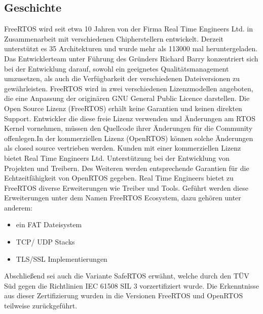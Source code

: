 \subsection{Geschichte}
FreeRTOS wird seit etwa 10 Jahren von der Firma Real Time Engineers Ltd. in Zusammenarbeit mit verschiedenen Chipherstellern entwickelt. Derzeit unterstützt es 35 Architekturen und wurde mehr als 113000 mal heruntergeladen. Das Entwicklerteam unter Führung des Gründers Richard Barry konzentriert sich bei der Entwicklung darauf, sowohl ein geeignetes Qualitätsmanagement umzusetzen, als auch die Verfügbarkeit der verschiedenen Dateiversionen zu gewährleisten. FreeRTOS wird in zwei verschiedenen Lizenzmodellen angeboten, die eine Anpassung der originären GNU General Public Licence darstellen. Die Open Source Lizenz (FreeRTOS) erhält keine Garantien und keinen direkten Support. Entwickler die diese freie Lizenz verwenden und Än\-der\-ungen am RTOS Kernel vornehmen, müssen den Quellcode ihrer Än\-der\-ungen für die Community offenlegen.\newline In der kommerziellen Lizenz (OpenRTOS) können solche Änderungen als closed source vertrieben werden. Kunden mit einer kommerziellen Lizenz bietet Real Time Engineers Ltd. Unterstützung bei der Entwicklung von Projekten und Treibern. Des Weiteren werden entsprechende Garantien für die Echt\-zeit\-fähig\-keit von OpenRTOS gegeben. Real Time Engineers bietet zu FreeRTOS diverse Erweiterungen wie Treiber und Tools. Ge\-führt werden diese Erweiterungen unter dem Namen FreeRTOS Ecosystem, dazu gehören unter anderem:
\begin{itemize}
	\item ein FAT Dateisystem
	\item TCP/ UDP Stacks
	\item TLS/SSL Implementierungen
\end{itemize}
Abschließend sei auch die Variante SafeRTOS erwähnt, welche durch den TÜV Süd gegen die Richtlinien IEC 61508 SIL 3 vorzertifiziert wurde. Die Erkenntnisse aus dieser Zertifizierung wurden in die Versionen FreeRTOS und OpenRTOS teilweise zurückgeführt.
